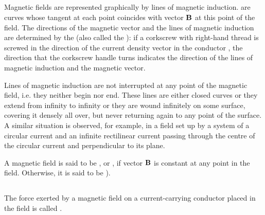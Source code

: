 \subsection{}\label{23.1.3} Magnetic fields are represented graphically by lines of magnetic induction.  are curves whose tangent at each point coincides with vector $\vb{B}$ at this point of the field. The directions of the magnetic vector and the lines of magnetic induction are determined by the  (also called the ): if a corkscrew with right-hand thread is screwed in the direction of the current density vector in the conductor , the direction that the corkscrew handle turns indicates the direction of the lines of magnetic induction and the magnetic vector.

Lines of magnetic induction are not interrupted at any point of the magnetic field, i.e. they neither begin nor end. These lines are either closed curves or they extend from infinity to infinity or they are wound infinitely on some surface, covering it densely all over, but never returning again to any point of the surface. A similar situation is observed, for example, in a field set up by a system of a circular current and an infinite rectilinear current passing through the centre of the circular current and perpendicular to its plane. 

A magnetic field is said to be , or , if vector $\vb{B}$ is constant at any point in the field. Otherwise, it is said to be ).

\subsection{}\label{23.1.4} The force exerted by a magnetic field on a current-carrying conductor placed in the field is called . 

